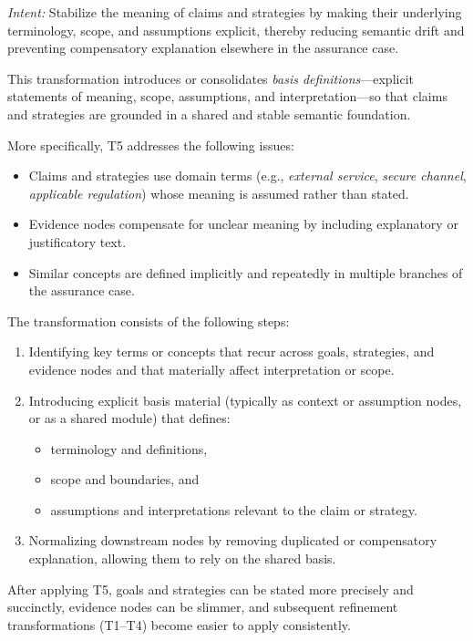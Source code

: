 \documentclass{article}
\begin{document}
\emph{Intent:} Stabilize the meaning of claims and strategies by making their underlying terminology, scope, and assumptions explicit, thereby reducing semantic drift and preventing compensatory explanation elsewhere in the assurance case.

This transformation introduces or consolidates \emph{basis definitions}---explicit statements of meaning, scope, assumptions, and interpretation---so that claims and strategies are grounded in a shared and stable semantic foundation.

More specifically, T5 addresses the following issues:

\begin{itemize}
  \item Claims and strategies use domain terms (e.g., \emph{external service}, \emph{secure channel}, \emph{applicable regulation}) whose meaning is assumed rather than stated.
  \item Evidence nodes compensate for unclear meaning by including explanatory or justificatory text.
  \item Similar concepts are defined implicitly and repeatedly in multiple branches of the assurance case.
\end{itemize}

The transformation consists of the following steps:

\begin{enumerate}
  \item Identifying key terms or concepts that recur across goals, strategies, and evidence nodes and that materially affect interpretation or scope.
  \item Introducing explicit basis material (typically as context or assumption nodes, or as a shared module) that defines:
    \begin{itemize}
      \item terminology and definitions,
      \item scope and boundaries, and
      \item assumptions and interpretations relevant to the claim or strategy.
    \end{itemize}
  \item Normalizing downstream nodes by removing duplicated or compensatory explanation, allowing them to rely on the shared basis.
\end{enumerate}

After applying T5, goals and strategies can be stated more precisely and succinctly, evidence nodes can be slimmer, and subsequent refinement transformations (T1--T4) become easier to apply consistently.
\end{document}
